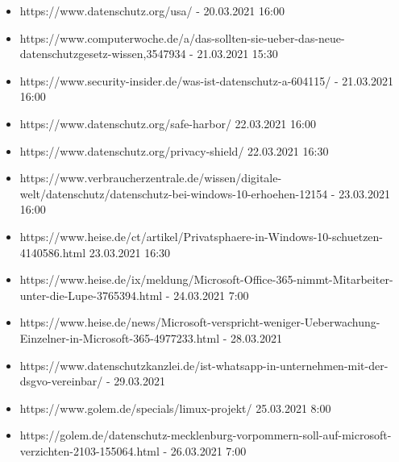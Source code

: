 \begin{itemize}
    \item https://www.datenschutz.org/usa/ - 20.03.2021 16:00
    \item https://www.computerwoche.de/a/das-sollten-sie-ueber-das-neue-datenschutzgesetz-wissen,3547934 - 21.03.2021 15:30
    \item https://www.security-insider.de/was-ist-datenschutz-a-604115/ - 21.03.2021 16:00
    \item https://www.datenschutz.org/safe-harbor/ 22.03.2021 16:00
    \item https://www.datenschutz.org/privacy-shield/ 22.03.2021 16:30
    \item https://www.verbraucherzentrale.de/wissen/digitale-welt/datenschutz/datenschutz-bei-windows-10-erhoehen-12154 - 23.03.2021 16:00
    \item https://www.heise.de/ct/artikel/Privatsphaere-in-Windows-10-schuetzen-4140586.html 23.03.2021 16:30
    \item https://www.heise.de/ix/meldung/Microsoft-Office-365-nimmt-Mitarbeiter-unter-die-Lupe-3765394.html - 24.03.2021 7:00
    \item https://www.heise.de/news/Microsoft-verspricht-weniger-Ueberwachung-Einzelner-in-Microsoft-365-4977233.html - 28.03.2021
    \item https://www.datenschutzkanzlei.de/ist-whatsapp-in-unternehmen-mit-der-dsgvo-vereinbar/ - 29.03.2021
    \item https://www.golem.de/specials/limux-projekt/ 25.03.2021 8:00
    \item https://golem.de/datenschutz-mecklenburg-vorpommern-soll-auf-microsoft-verzichten-2103-155064.html - 26.03.2021 7:00
\end{itemize}